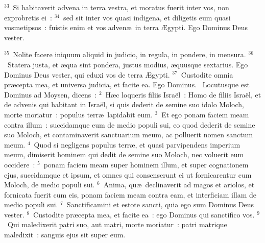 ${}^{33}$~Si habitaverit advena in terra vestra, et moratus fuerit inter vos, non exprobretis ei~:
${}^{34}$~sed sit inter vos quasi indigena, et diligetis eum quasi vosmetipsos~: fuistis enim et vos adven\ae\ in terra \AE gypti. Ego Dominus Deus vester.


${}^{35}$~Nolite facere iniquum aliquid in judicio, in regula, in pondere, in mensura.
${}^{36}$~Statera justa, et \ae qua sint pondera, justus modius, \ae quusque sextarius. Ego Dominus Deus vester, qui eduxi vos de terra \AE gypti.
${}^{37}$~Custodite omnia pr\ae cepta mea, et universa judicia, et facite ea. Ego Dominus.
~\lettrine[lines=10,image=true,loversize=0.05,lraise=-0.03]{L}{}ocutusque est Dominus ad Moysen, dicens~:
${}^{2}$~H\ae c loqueris filiis Isra\"el~: Homo de filiis Isra\"el, et de advenis qui habitant in Isra\"el, si quis dederit de semine suo idolo Moloch, morte moriatur~: populus terr\ae\ lapidabit eum.
${}^{3}$~Et ego ponam faciem meam contra illum~: succidamque eum de medio populi sui, eo quod dederit de semine suo Moloch, et contaminaverit sanctuarium meum, ac polluerit nomen sanctum meum.
${}^{4}$~Quod si negligens populus terr\ae , et quasi parvipendens imperium meum, dimiserit hominem qui dedit de semine suo Moloch, nec voluerit eum occidere~:
${}^{5}$~ponam faciem meam super hominem illum, et super cognationem ejus, succidamque et ipsum, et omnes qui consenserunt ei ut fornicarentur cum Moloch, de medio populi sui.
${}^{6}$~Anima, qu\ae\ declinaverit ad magos et ariolos, et fornicata fuerit cum eis, ponam faciem meam contra eam, et interficiam illam de medio populi sui.
${}^{7}$~Sanctificamini et estote sancti, quia ego sum Dominus Deus vester.
${}^{8}$~Custodite pr\ae cepta mea, et facite ea~: ego Dominus qui sanctifico vos.
${}^{9}$~Qui maledixerit patri suo, aut matri, morte moriatur~: patri matrique maledixit~: sanguis ejus sit super eum.


